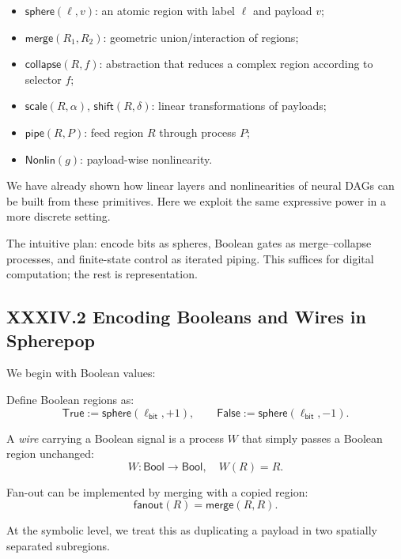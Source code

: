 \documentclass[11pt,letterpaper]{article}
\begin{document}
\begin{itemize}
  \item $\mathsf{sphere}(\ell, v)$: an atomic region with label $\ell$ and payload $v$;
  \item $\mathsf{merge}(R_1, R_2)$: geometric union/interaction of regions;
  \item $\mathsf{collapse}(R, f)$: abstraction that reduces a complex region according to selector $f$;
  \item $\mathsf{scale}(R, \alpha)$, $\mathsf{shift}(R, \delta)$: linear transformations of payloads;
  \item $\mathsf{pipe}(R, P)$: feed region $R$ through process $P$;
  \item $\mathsf{Nonlin}(g)$: payload-wise nonlinearity.
\end{itemize}

We have already shown how linear layers and nonlinearities of neural DAGs can be built from these primitives. Here we exploit the same expressive power in a more discrete setting.

The intuitive plan: encode bits as spheres, Boolean gates as merge--collapse processes, and finite-state control as iterated piping. This suffices for digital computation; the rest is representation.

\subsection{XXXIV.2 Encoding Booleans and Wires in Spherepop}

We begin with Boolean values:

\begin{definition}
Define Boolean regions as:
\[
\mathsf{True}  := \mathsf{sphere}(\ell_{\mathsf{bit}}, +1), \qquad
\mathsf{False} := \mathsf{sphere}(\ell_{\mathsf{bit}}, -1).
\]
\end{definition}

A \emph{wire} carrying a Boolean signal is a process $W$ that simply passes a Boolean region unchanged:
\[
W : \mathsf{Bool} \to \mathsf{Bool}, \quad W(R) = R.
\]

Fan-out can be implemented by merging with a copied region:
\[
\mathsf{fanout}(R) = \mathsf{merge}(R, R).
\]

At the symbolic level, we treat this as duplicating a payload in two spatially separated subregions.
\end{document}
